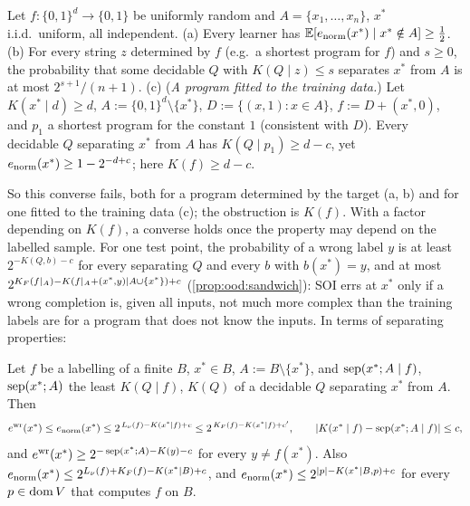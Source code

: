 \begin{proposition}\label{prop:ood:converse}
Let $f:\{0,1\}^d\to\{0,1\}$ be uniformly random and $A=\{x_1,\dots,x_n\}$, $x^*$ i.i.d.\ uniform, all independent.
(a) Every learner has $\mathbb{E}[e_{\rm norm}(x^*)\mid x^*\notin A]\ge\frac12$.
(b) For every string $z$ determined by $f$ (e.g.\ a shortest program for $f$) and $s\ge0$, the probability that some decidable $Q$ with $K(Q\mid z)\le s$ separates $x^*$ from $A$ is at most $2^{s+1}/(n+1)$.
(c) (\emph{A program fitted to the training data.}) Let $K(x^*\mid d)\ge d$, $A:=\{0,1\}^d\setminus\{x^*\}$, $D:=\{(x,1):x\in A\}$, $f:=D+(x^*,0)$, and $p_1$ a shortest program for the constant $1$ (consistent with $D$). Every decidable $Q$ separating $x^*$ from $A$ has $K(Q\mid p_1)\ge d-c$, yet $e_{\rm norm}(x^*)\ge1-2^{-d+c}$; here $K(f)\ge d-c$.
\end{proposition}

So this converse fails, both for a program determined by the target (a, b) and for one fitted to the training data (c); the obstruction is $K(f)$. With a factor depending on $K(f)$, a converse holds once the property may depend on the labelled sample. For one test point, the probability of a wrong label $y$ is at least $2^{-K(Q,b)-c}$ for every separating $Q$ and every $b$ with $b(x^*)=y$, and at most $2^{K_{F}(f|_A)-K(f|_A+(x^*,y)\mid A\cup\{x^*\})+c}$ (\cref{prop:ood:sandwich}): SOI errs at $x^*$ only if a wrong completion is, given all inputs, not much more complex than the training labels are for a program that does not know the inputs. In terms of separating properties:

\begin{proposition}\label{prop:ood:labelled}
Let $f$ be a labelling of a finite $B$, $x^*\in B$, $A:=B\setminus\{x^*\}$, and $\operatorname{sep}(x^*;A\mid f)$, $\operatorname{sep}(x^*;A)$ the least $K(Q\mid f)$, $K(Q)$ of a decidable $Q$ separating $x^*$ from $A$. Then
\[ e^{\rm wr}(x^*)\le e_{\rm norm}(x^*)\le2^{\,L_\nu(f)-K(x^*\mid f)+c}\le2^{\,K_{F}(f)-K(x^*\mid f)+c'},\qquad |K(x^*\mid f)-\operatorname{sep}(x^*;A\mid f)|\le c, \]
and $e^{\rm wr}(x^*)\ge2^{-\operatorname{sep}(x^*;A)-K(y)-c}$ for every $y\ne f(x^*)$. Also $e_{\rm norm}(x^*)\le2^{L_\nu(f)+K_{F}(f)-K(x^*\mid B)+c}$, and $e_{\rm norm}(x^*)\le2^{|p|-K(x^*\mid B,p)+c}$ for every $p\in\operatorname{dom} V$ that computes $f$ on $B$.
\end{proposition}

